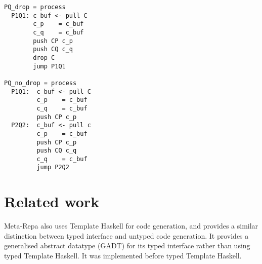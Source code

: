 \begin{lstlisting}
PQ_drop = process
  P1Q1: c_buf <- pull C
        c_p    = c_buf
        c_q    = c_buf
        push CP c_p
        push CQ c_q
        drop C
        jump P1Q1

PQ_no_drop = process
  P1Q1:  c_buf <- pull C
         c_p    = c_buf
         c_q    = c_buf
         push CP c_p
  P2Q2:  c_buf <- pull c
         c_p    = c_buf
         push CP c_p
         push CQ c_q
         c_q    = c_buf
         jump P2Q2
\end{lstlisting}


\section{Related work}
Meta-Repa \cite{ankner2013edsl} also uses Template Haskell for code generation, and provides a similar distinction between typed interface and untyped code generation.
It provides a generalised abstract datatype (GADT) for its typed interface rather than using typed Template Haskell.
It was implemented before typed Template Haskell.

